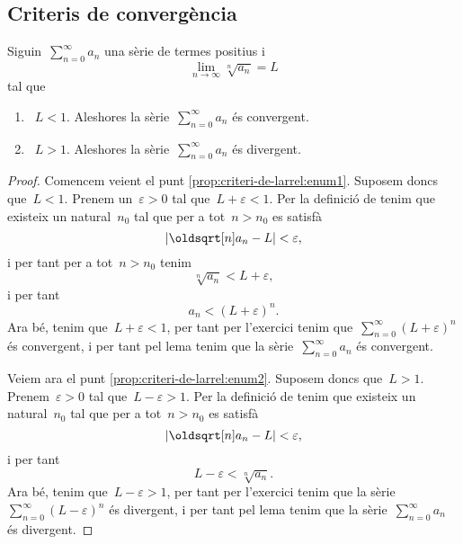 \documentclass[../../main.tex]{subfiles}
\begin{document}
    \subsection{Criteris de convergència}
    \begin{proposition}
        \label{prop:criteri-de-larrel}
        Siguin~\(\sum_{n=0}^{\infty}a_{n}\) una sèrie de termes positius i
        \[
            \lim_{n\to\infty}\sqrt[n]{a_{n}}=L
        \]
        tal que
        \begin{enumerate}
            \item\label{prop:criteri-de-larrel:enum1}~\(L<1\).
            Aleshores la sèrie~\(\sum_{n=0}^{\infty}a_{n}\) és convergent.
            \item\label{prop:criteri-de-larrel:enum2}~\(L>1\).
            Aleshores la sèrie~\(\sum_{n=0}^{\infty}a_{n}\) és divergent.
        \end{enumerate}
    \end{proposition}
    \begin{proof}
        Comencem veient el punt \eqref{prop:criteri-de-larrel:enum1}.
         Suposem doncs que~\(L<1\).
        Prenem un~\(\varepsilon>0\) tal que~\(L+\varepsilon<1\).
        Per la definició de  tenim que existeix un natural~\(n_{0}\) tal que per a tot~\(n>n_{0}\) es satisfà
        \[
            \abs{\sqrt[n]{a_{n}}-L}<\varepsilon,
        \]
        i per tant per a tot~\(n>n_{0}\) tenim
        \[
            \sqrt[n]{a_{n}}<L+\varepsilon,
        \]
        i per tant
        \[
            a_{n}<\left(L+\varepsilon\right)^{n}.
        \]
        Ara bé, tenim que~\(L+\varepsilon<1\), per tant per l'exercici  tenim que~\(\sum_{n=0}^{\infty}(L+\varepsilon)^{n}\) és convergent, i per tant pel lema  tenim que la sèrie~\(\sum_{n=0}^{\infty}a_{n}\) és convergent.

        Veiem ara el punt \eqref{prop:criteri-de-larrel:enum2}.
        Suposem doncs que~\(L>1\).
        Prenem~\(\varepsilon>0\) tal que~\(L-\varepsilon>1\).
        Per la definició de  tenim que existeix un natural~\(n_{0}\) tal que per a tot~\(n>n_{0}\) es satisfà
        \[
            \abs{\sqrt[n]{a_{n}}-L}<\varepsilon,
        \]
        i per tant
        \[
            L-\varepsilon<\sqrt[n]{a_{n}}.
        \]
        Ara bé, tenim que~\(L-\varepsilon>1\), per tant per l'exercici  tenim que la sèrie~\(\sum_{n=0}^{\infty}(L-\varepsilon)^{n}\) és divergent, i per tant pel lema  tenim que la sèrie~\(\sum_{n=0}^{\infty}a_{n}\) és divergent.
    \end{proof}
\end{document}
